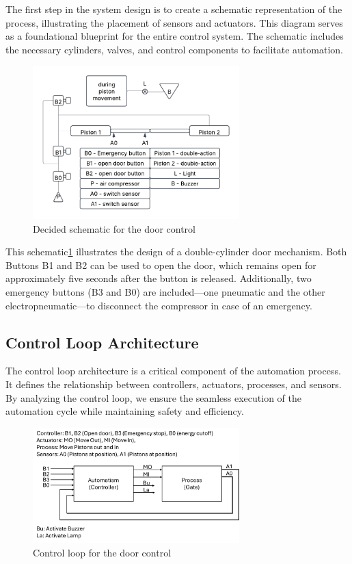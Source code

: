 The first step in the system design is to create a schematic representation of the process, 
illustrating the placement of sensors and actuators. This diagram serves as a foundational blueprint 
for the entire control system. The schematic includes the necessary cylinders, valves, and control 
components to facilitate automation.

\begin{figure}[H]
    \includegraphics[width=8cm]{Images/schematic.png}
    \centering
    \caption{Decided schematic for the door control}
    \label{fig:schematic}
\end{figure}

This schematic\ref{fig:schematic} illustrates the design of a double-cylinder door mechanism. Both Buttons B1 and B2 
can be used to open the door, which remains open for approximately five seconds after the button is 
released. Additionally, two emergency buttons (B3 and B0) are included—one pneumatic and the other 
electropneumatic—to disconnect the compressor in case of an emergency.

\subsection{Control Loop Architecture} \label{sec:Control_Loop_Architecture}

The control loop architecture is a critical component of the automation process. It 
defines the relationship between controllers, actuators, processes, and sensors. By 
analyzing the control loop, we ensure the seamless execution of the automation cycle while maintaining safety and efficiency.

\begin{figure}[H]
    \includegraphics[width=8cm]{Images/control_loop.png}
    \centering
    \caption{Control loop for the door control}
    \label{fig:control_loop}
\end{figure}

